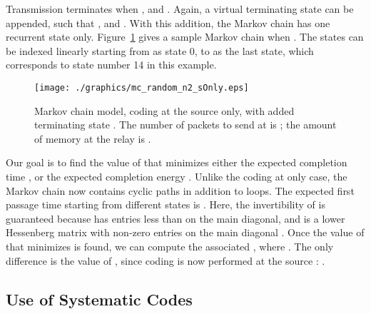 \documentclass[journal, letterpaper]{IEEEtran}
\begin{document}
\begin{itemize}
Transmission terminates when , and . Again, a virtual terminating state  can be appended, such that , and . With this addition, the Markov chain has one recurrent state only. Figure~\ref{fig:mc_n2_sOnly} gives a sample Markov chain when . The states can be indexed linearly starting from  as state 0, to  as the last state, which corresponds to state number 14 in this example.

\begin{figure}[t!]
  \centering
  \texttt{[image: ./graphics/mc\_random\_n2\_sOnly.eps]}
  \caption{Markov chain model, coding at the source  only,  with added terminating state . The number of packets to send at  is ; the amount of memory at the relay  is .}
  \label{fig:mc_n2_sOnly}
\end{figure}

Our goal is to find the value of  that minimizes either the expected completion time , or the expected completion energy . Unlike the coding at  only case, the Markov chain now contains cyclic paths in addition to loops. The expected first passage time starting from different states is . Here, the invertibility of  is guaranteed because   has entries less than  on the main diagonal, and  is a lower Hessenberg matrix with non-zero entries on the main diagonal \cite{horn1990matrix}. Once the value of  that minimizes  is found, we can compute the associated , where . The only difference is the value of , since coding is now performed at the source : .

\subsection{Use of Systematic Codes}\label{subsec:systematic}


\end{itemize}
\end{document}
